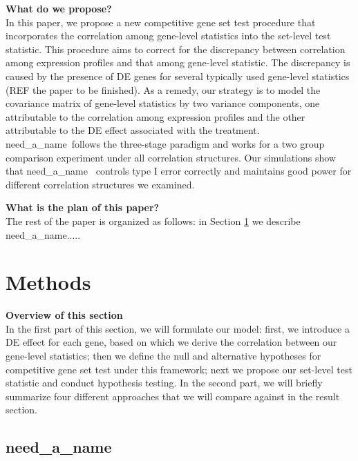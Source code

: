 \documentclass[useAMS,usenatbib, galley]{biom}
\newcommand{\OurMethod}{need\_a\_name}
\begin{document}
	
	
	\textbf{What do we propose?} \\
	In this paper, we propose a new competitive gene set test procedure that incorporates the correlation among gene-level statistics into the set-level test statistic. This procedure aims to correct for the discrepancy between correlation among expression profiles and that among gene-level statistic. The discrepancy is caused by the presence of DE genes for several typically used gene-level statistics (REF the paper to be finished). As a remedy, our strategy is to model the covariance matrix of gene-level statistics by two variance components, one attributable to the correlation among expression profiles and the other attributable to the DE effect associated with the treatment. \OurMethod~follows the three-stage paradigm and works for a two group comparison experiment under all correlation structures. Our simulations show that \OurMethod~ controls type I error correctly and maintains good power for different correlation structures we examined. 
	
	\textbf{What is the plan of this paper?} \\
	The rest of the paper is organized as follows: in Section \ref{section:methods} we describe \OurMethod.....
	
	
	
	\section{Methods}\label{section:methods}
	\textbf{Overview of this section} \\
	In the first part of this section, we will formulate our model: first, we introduce a DE effect for each gene, based on which we derive the correlation between our gene-level statistics; then we define the null and alternative hypotheses for competitive gene set test under this framework; next we propose our set-level test statistic and conduct hypothesis testing. In the second part, we will briefly summarize four different approaches that we will compare against in the result section.  
	
	\subsection{\OurMethod}
\end{document}
